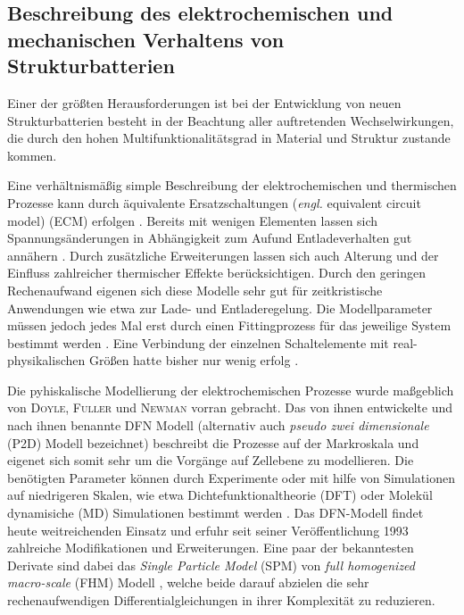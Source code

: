 \subsection{Beschreibung des elektrochemischen und mechanischen Verhaltens von Strukturbatterien}
Einer der größten Herausforderungen ist bei der Entwicklung von neuen Strukturbatterien besteht in der Beachtung aller auftretenden Wechselwirkungen, die durch den hohen Multifunktionalitätsgrad in Material und Struktur zustande kommen.

Eine verhältnismäßig simple Beschreibung der elektrochemischen und thermischen Prozesse kann durch äquivalente Ersatzschaltungen (\textit{engl.} equivalent circuit model) (ECM) erfolgen \cite{Bavsic2022}. Bereits mit wenigen Elementen lassen sich Spannungsänderungen in Abhängigkeit zum Aufund Entladeverhalten gut annähern \cite{YannLiaw2004}. Durch zusätzliche Erweiterungen lassen sich auch Alterung und der Einfluss zahlreicher thermischer Effekte berücksichtigen\cite{Hannan2017,Tran2021}.
Durch den geringen Rechenaufwand eigenen sich diese Modelle sehr gut für zeitkristische Anwendungen wie etwa zur Lade- und Entladeregelung. Die Modellparameter müssen jedoch jedes Mal erst durch einen Fittingprozess für das jeweilige System bestimmt werden \cite{Tomasov2019}. Eine Verbindung der einzelnen Schaltelemente mit real-physikalischen Größen hatte bisher nur wenig erfolg \cite{Plett2015}.

Die pyhiskalische Modellierung der elektrochemischen Prozesse wurde maßgeblich von \textsc{Doyle}\cite{Doyle1995,Doyle2003,Ceder2002}, \textsc{Fuller}\cite{Fuller2018,Takeuchi2008} und \textsc{Newman}\cite{Doyle1995,Newman2021} vorran gebracht. Das von ihnen entwickelte und nach ihnen benannte DFN Modell (alternativ auch \textit{pseudo zwei dimensionale} (P2D) Modell bezeichnet) \cite{Doyle1993} beschreibt die Prozesse auf der Markroskala und eigenet sich somit sehr um die Vorgänge auf Zellebene zu modellieren. Die benötigten Parameter können durch Experimente oder mit hilfe von Simulationen auf niedrigeren Skalen, wie etwa Dichtefunktionaltheorie (DFT) oder Molekül dynamisiche (MD) Simulationen bestimmt werden \cite{Chen2022}. Das DFN-Modell findet heute weitreichenden Einsatz und erfuhr seit seiner Veröffentlichung 1993 zahlreiche Modifikationen und Erweiterungen. Eine paar der bekanntesten Derivate sind dabei das \textit{Single Particle Model} (SPM) \cite{Li2017} von \textit{full homogenized macro-scale} (FHM) Modell \cite{Arunachalam2019}, welche beide darauf abzielen die sehr rechenaufwendigen Differentialgleichungen in ihrer Komplexität zu reduzieren. 

